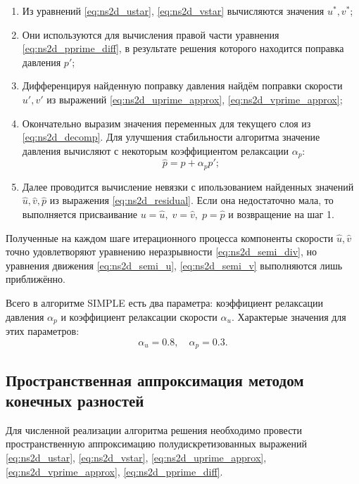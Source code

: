 \begin{enumerate}
\item Из уравнений \eqref{eq:ns2d_ustar}, \eqref{eq:ns2d_vstar}
      вычисляются значения $u^*, v^*$;
\item Они используются для вычисления правой части уравнения \eqref{eq:ns2d_pprime_diff},
      в результате решения которого находится поправка давления $p'$;
\item Дифференцируя найденную поправку давления найдём поправки скорости $u', v'$
      из выражений \eqref{eq:ns2d_uprime_approx}, \eqref{eq:ns2d_vprime_approx};
\item Окончательно выразим значения переменных для текущего слоя из \eqref{eq:ns2d_decomp}.
      Для улучшения стабильности алгоритма значение давления вычисляют
      с некоторым коэффициентом релаксации $\alpha_p$:
      \begin{equation*}
           \hat p = p + \alpha_p p';
      \end{equation*}
\item Далее проводится вычисление невязки с ипользованием найденных значений $\hat u, \hat v, \hat p$
      из выражения \eqref{eq:ns2d_residual}. Если она недостаточно мала,
      то выполняется присваивание
      $
           u = \hat u, \; v=\hat v, \; p = \hat p
      $ 
      и возвращение на шаг 1.
\end{enumerate}

Полученные на каждом шаге итерационного процесса компоненты скорости $\hat u, \hat v$
точно удовлетворяют уравнению неразрывности \eqref{eq:ns2d_semi_div}, но
уравнения движения \eqref{eq:ns2d_semi_u}, \eqref{eq:ns2d_semi_v} выполняются лишь приближённо.

Всего в алгоритме SIMPLE есть два параметра: коэффициент
релаксации давления $\alpha_p$ и коэффициент релаксации скорости $\alpha_u$.
Характерые значения для этих параметров:
\begin{equation*}
\alpha_u = 0.8, \quad \alpha_p = 0.3.
\end{equation*}

\subsection{Пространственная аппроксимация методом конечных разностей}
\label{sec:simple_scheme_fdm}

Для численной реализации алгоритма решения
необходимо провести пространственную аппроксимацию полудискретизованных
выражений
\eqref{eq:ns2d_ustar}, \eqref{eq:ns2d_vstar}, \eqref{eq:ns2d_uprime_approx},
\eqref{eq:ns2d_vprime_approx}, \eqref{eq:ns2d_pprime_diff}.

